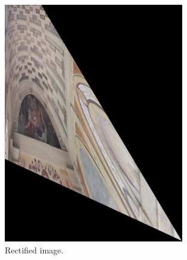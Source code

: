 \documentclass[a4paper, 11pt, oneside, openright, english]{book}
\begin{document}
\begin{figure}[H]
    \centering
    \includegraphics[width=0.7\textwidth]{../images/affRect.JPG}
    \caption{Rectified image.}
\end{figure}
\end{document}
